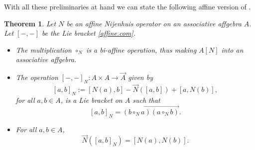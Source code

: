 \documentclass[10pt,a4paper]{amsart}
\numberwithin{equation}{section}
\newtheorem{Theorem}{Theorem}[section]
\begin{document}
With all these preliminaries at hand we can state the following affine version of \cite[Theorem~8]{4}.

\begin{Theorem}\label{thm.affine.Lie}
Let $N$ be an affine Nijenhuis operator on an associative affgebra $A$. Let $[-,-]$ be the Lie bracket \eqref{affine.com}.
\begin{itemize}\itemsep=0pt
 \item[$(1)$] The multiplication $\circ_N$ is a bi-affine operation, thus making $A[N]$ into an associative affgebra.
 \item[$(2)$] The operation $[-,-]_N\colon A\times A\to \vec{A}$ given by
 \[
 [a,b]_N := [N(a),b] -\vec{N}([a,b]) + [a, N(b)],
 \]
 for all $a,b\in A$, is a Lie bracket on $A$ such that
 \[
 [a,b]_N = \overrightarrow{(b\circ_N a)(a\circ_N b)}.
 \]
 \item[$(3)$] For all $a,b\in A$,
 \[
\vec{N}([a,b]_N) = [N(a), N(b)].
 \]
\end{itemize}
\end{Theorem}
\end{document}
